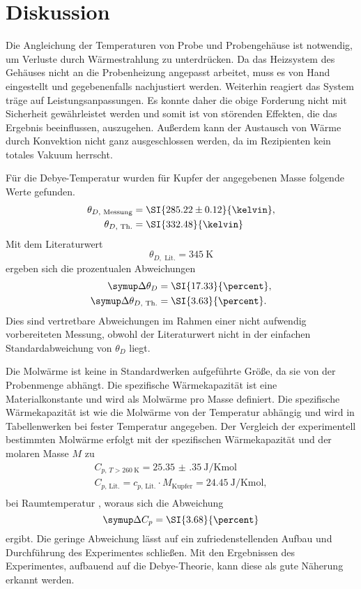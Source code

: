 \section{Diskussion}
\label{sec:Diskussion}

Die Angleichung der Temperaturen von Probe und Probengehäuse ist notwendig, um Verluste durch Wärmestrahlung zu unterdrücken.
Da das Heizsystem des Gehäuses nicht an die Probenheizung angepasst arbeitet,
muss es von Hand eingestellt und gegebenenfalls nachjustiert werden.
Weiterhin reagiert das System träge auf Leistungsanpassungen.
Es konnte daher die obige Forderung nicht mit Sicherheit gewährleistet werden und
somit ist von störenden Effekten, die das Ergebnis beeinflussen, auszugehen.
Außerdem kann der Austausch von Wärme durch Konvektion nicht ganz ausgeschlossen werden, da im Rezipienten kein totales Vakuum herrscht.

Für die Debye-Temperatur wurden für Kupfer der angegebenen Masse folgende Werte gefunden.
\begin{align}
	\theta_{D,\text{ Messung}} &= \SI{285.22\pm0.12}{\kelvin},\\
	\theta_{D,\text{ Th.}} &= \SI{332.48}{\kelvin}
\end{align}
Mit dem Literaturwert \cite{debye-kupfer}
\begin{equation}
	\theta_{D,\text{ Lit.}} = \SI{345}{\kelvin}
\end{equation}
ergeben sich die prozentualen Abweichungen
\begin{align}
	\symup\Delta\theta_D &= \SI{17.33}{\percent},\\
	\symup\Delta\theta_{D,\text{ Th.}} &= \SI{3.63}{\percent}.
\end{align}
Dies sind vertretbare Abweichungen im Rahmen einer nicht aufwendig vorbereiteten Messung,
obwohl der Literaturwert nicht in der einfachen Standardabweichung von $\theta_D$ liegt.

Die Molwärme ist keine in Standardwerken aufgeführte Größe, da sie von der Probenmenge abhängt.
Die spezifische Wärmekapazität ist eine Materialkonstante und wird als Molwärme pro Masse definiert.
Die spezifische Wärmekapazität ist wie die Molwärme von der Temperatur abhängig und wird in Tabellenwerken bei fester Temperatur angegeben.
Der Vergleich der experimentell bestimmten Molwärme erfolgt mit der spezifischen Wärmekapazität und der molaren Masse $M$ zu
\begin{align}
	C_{p, \, T > \SI{260}{\kelvin}} =\SI{25.35(35)}{\joule\per\kelvin\mol}\\
	C_{p,\,\text{Lit.}} = c_{p,\,\text{Lit.}}\cdot M_{\text{Kupfer}}= \SI{24.45}{\joule\per\kelvin\mol},\\
\end{align}
bei Raumtemperatur \cite{chem}, woraus sich die Abweichung
\begin{equation}
	\symup\Delta C_p = \SI{3.68}{\percent}
\end{equation}
ergibt.
Die geringe Abweichung lässt auf ein zufriedenstellenden Aufbau und Durchführung des Experimentes schließen.
Mit den Ergebnissen des Experimentes, aufbauend auf die Debye-Theorie, kann diese als gute Näherung erkannt werden.
